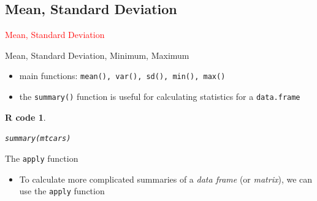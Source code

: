 \documentclass[11pt]{beamer}\usepackage[]{graphicx}\usepackage[]{color}
\makeatletter
\newcommand{\hlstd}[1]{\textcolor[rgb]{0.196,0.196,0.196}{#1}}%
\newcommand{\hlkwd}[1]{\textcolor[rgb]{0.78,0.227,0.412}{#1}}%
\newenvironment{kframe}{%
 \def\at@end@of@kframe{}%
 \ifinner\ifhmode%
  \def\at@end@of@kframe{\end{minipage}}%
  \begin{minipage}{\columnwidth}%
 \fi\fi%
 \def\FrameCommand##1{\hskip\@totalleftmargin \hskip-\fboxsep
 \colorbox{shadecolor}{##1}\hskip-\fboxsep
     \hskip-\linewidth \hskip-\@totalleftmargin \hskip\columnwidth}%
 \MakeFramed {\advance\hsize-\width
   \@totalleftmargin\z@ \linewidth\hsize
   \@setminipage}}%
 {\par\unskip\endMakeFramed%
 \at@end@of@kframe}
\newenvironment{knitrout}{}{} %
\newtheorem{rcode}{R code}[section]
\newcommand{\code}[1]{\texttt{#1}}
\makeatother
\begin{document}

\subsection{Mean, Standard Deviation}

\begin{frame}
 \begin{center}
  \Huge{\textcolor{red}{Mean, Standard Deviation}}
 \end{center}
\end{frame}



\begin{frame}[fragile]{Mean, Standard Deviation, Minimum, Maximum}

\begin{itemize}
  \setlength\itemsep{2em}
\item main functions: \code{mean(), var(), sd(), min(), max()}
\pause \item the \code{summary()} function is useful for calculating statistics for a \code{data.frame}
\end{itemize}
\pause 
\begin{knitrout}
\color{fgcolor}\begin{kframe}
\begin{rcode}\label{unnamed-chunk-36}\begin{alltt}
\hlkwd{summary}\hlstd{(mtcars)}
\end{alltt}
\end{rcode}\end{kframe}
\end{knitrout}
\end{frame}




\begin{frame}[fragile]{The \code{apply} function}
\begin{itemize}
  \setlength\itemsep{1em}
\item To calculate more complicated summaries of a \textit{data frame} (or \textit{matrix}), we can use the \code{apply} function
\end{itemize}


\end{frame}
\end{document}
